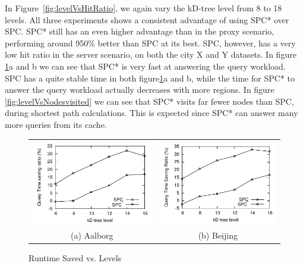 %
%
In Figure~\ref{fig:levelVsHitRatio}, we again vary the kD-tree level from 8 to 18 levels. All three experiments shows a consistent advantage of using SPC* over SPC. SPC* still has an even higher advantage than in the proxy scenario, performing around 950\% better than SPC at its best. SPC, however, has a very low hit ratio in the server scenario, on both the city X and Y datasets. In figure \ref{fig:levelVsruntime}a and b we can see that SPC* is very fast at answering the query workload. SPC has a quite stable time in both figure\ref{fig:levelVsruntime}a and b, while the time for SPC* to answer the query workload actually decreases with more regions. In figure \ref{fig:levelVsNodesvisited} we can see that SPC* visits far fewer nodes than SPC, during shortest path calculations. This is expected since SPC* can answer many more queries from its cache.





\begin{figure}[htb]
\center
  \begin{tabular}{@{}c@{ }c@{}}
     \includegraphics[width=0.5\columnwidth]{figures/split_diffruntime_aal_server.pdf}
     &
     \includegraphics[width=0.5\columnwidth]{figures/split_diffruntime_bei_server.pdf}
      \\
     (a) Aalborg & (b)  Beijing
     \end{tabular}
\caption{Runtime Saved vs. Levels}
\label{fig:levelVsruntime}
\end{figure}

